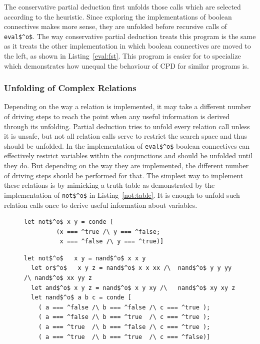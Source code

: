 The conservative partial deduction first unfolds those calls which are selected according to the heuristic.
Since exploring the implementations of boolean connectives makes more sense, they are unfolded before recursive calls of \lstinline{eval$^o$}.
The way conservative partial deduction treats this program is the same as it treats the other implementation in which boolean connectives
are moved to the left, as shown in Listing~\ref{eval:fst}.
This program is easier for \ecce to specialize which demonstrates how unequal the behaviour of CPD for similar programs is.

\subsubsection{Unfolding of Complex Relations}

Depending on the way a relation is implemented, it may take a different number of driving steps to reach the point when any useful information is derived through its unfolding.
Partial deduction tries to unfold every relation call unless it is unsafe, but not all relation calls serve to restrict the search space and thus should be unfolded.
In the implementation of \lstinline{eval$^o$} boolean connectives can effectively restrict variables within the conjunctions and should be unfolded until they do.
But depending on the way they are implemented, the different number of driving steps should be performed for that.
The simplest way to implement these relations is by mimicking a truth table as demonstrated by the implementation of \lstinline{not$^o$} in Listing~\ref{not:table}.
It is enough to unfold such relation calls once to derive useful information about variables.

\begin{figure}[!t]
  \centering
  \begin{minipage}{0.5\textwidth}
    \begin{lstlisting}[label={not:table}, caption={Implementation of boolean not$^o$ as a table}, captionpos=b, frame=tb]
      let not$^o$ x y = conde [
         (x === ^true /\ y === ^false;
          x === ^false /\ y === ^true)]
    \end{lstlisting}
  \end{minipage}
  \begin{minipage}{0.8\textwidth}
    \begin{lstlisting}[label={not:nando}, caption={Implementation of boolean operations via nand$^o$}, captionpos=b, frame=tb]
  let not$^o$   x y = nand$^o$ x x y
  let or$^o$   x y z = nand$^o$ x x xx /\  nand$^o$ y y yy /\ nand$^o$ xx yy z
  let and$^o$ x y z = nand$^o$ x y xy /\   nand$^o$ xy xy z
  let nand$^o$ a b c = conde [
    ( a === ^false /\ b === ^false /\ c === ^true );
    ( a === ^false /\ b === ^true  /\ c === ^true );
    ( a === ^true  /\ b === ^false /\ c === ^true );
    ( a === ^true  /\ b === ^true  /\ c === ^false)]
    \end{lstlisting}
  \end{minipage}
\end{figure}

